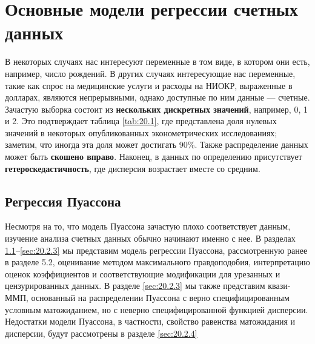 \section{Основные модели регрессии счетных данных}\label{sec:20.2}

\noindent
В некоторых случаях нас интересуют переменные в том виде, в котором они есть, например, число рождений. В других случаях интересующие нас переменные, такие как спрос на медицинские услуги и расходы на НИОКР, выраженные в долларах, являются непрерывными, однако доступные по ним данные --- счетные. Зачастую выборка состоит из \textbf{нескольких дискретных значений}, например, 0, 1 и 2. Это подтверждает таблица \ref{tab:20.1}, где представлена доля нулевых значений в некоторых опубликованных эконометрических исследованиях; заметим, что иногда эта доля может достигать 90\%. Также распределение данных может быть \textbf{скошено вправо}. Наконец, в данных по определению присутствует \textbf{гетероскедастичность}, где дисперсия возрастает вместе со средним.


\subsection{Регрессия Пуассона}\label{sec:20.2.1}

\noindent
Несмотря на то, что модель Пуассона зачастую плохо соответствует данным, изучение анализа счетных данных обычно начинают именно с нее. В разделах \ref{sec:20.2.1}--\ref{sec:20.2.3} мы представим модель регрессии Пуассона, рассмотренную ранее в разделе 5.2, %
оценивание методом максимального правдоподобия, интерпретацию оценок коэффициентов и соответствующие модификации для урезанных и цензурированных данных. В разделе \ref{sec:20.2.3} мы также представим квази-ММП, основанный на распределении Пуассона с верно специфицированным условным матожиданием, но с неверно специфицированной функцией дисперсии. Недостатки модели Пуассона, в частности, свойство равенства матожидания и дисперсии, будут рассмотрены в разделе \ref{sec:20.2.4}

